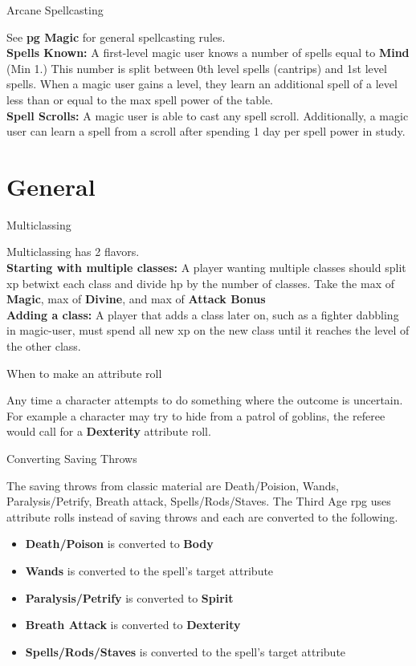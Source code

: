 \documentclass[18pt]{article}
\begin{document}
\begin{multicols}{2}
\begin{mercHeading}
Arcane Spellcasting
\end{mercHeading}
See  \textbf{pg \pageref{section:GenMagicRules} Magic} for general spellcasting rules. \\
\textbf{Spells Known:} A first-level magic user knows a number of spells equal to \textbf{Mind} (Min 1.) This number is split between 0th level spells (cantrips) and 1st level spells. When a magic user gains a level, they learn an additional spell of a level less than or equal to the max spell power of the table. \vspace{2pt}\\ 
\textbf{Spell Scrolls:}
A magic user is able to cast any spell scroll. Additionally, a magic user can learn a spell from a scroll after spending 1 day per spell power in study.\\

\section*{General} %
\begin{mercHeading}
Multiclassing
\end{mercHeading}
Multiclassing has 2 flavors.\\
\textbf{Starting with multiple classes:} A player wanting multiple classes should split xp betwixt each class and divide hp by the number of classes. Take the max of \textbf{Magic}, max of \textbf{Divine}, and max of \textbf{Attack Bonus} \\
\textbf{Adding a class:} A player that adds a class later on, such as a fighter dabbling in magic-user, must spend all new xp on the new class until it reaches the level of the other class.
\begin{mercHeading}
When to make an attribute roll
\end{mercHeading}
Any time a character attempts to do something where the outcome is uncertain. For example a character may try to hide from a patrol of goblins, the referee would call for a \textbf{Dexterity} attribute roll.
\begin{mercHeading}
Converting Saving Throws
\end{mercHeading}
The saving throws from classic material are Death/Poision, Wands, Paralysis/Petrify, Breath attack, Spells/Rods/Staves. The Third Age rpg uses attribute rolls instead of saving throws and each are converted to the following.
\begin{itemize}
\setlength\itemsep{0em}
	\item \textbf{Death/Poison} is converted to \textbf{Body}
	\item \textbf{Wands} is converted to the spell's target attribute
	\item \textbf{Paralysis/Petrify} is converted to \textbf{Spirit}
	\item \textbf{Breath Attack} is converted to \textbf{Dexterity}
	\item \textbf{Spells/Rods/Staves} is converted to the spell's target attribute
\end{itemize}



\end{multicols}
\end{document}
